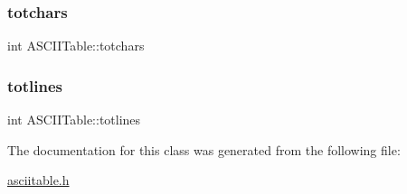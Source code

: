 \subsubsection{\texorpdfstring{totchars}{totchars}}
{\footnotesize\ttfamily int A\+S\+C\+I\+I\+Table\+::totchars}

\mbox{\label{classASCIITable_a130cbac5edad2ce441d7532c0d8b7ba9}} 
\subsubsection{\texorpdfstring{totlines}{totlines}}
{\footnotesize\ttfamily int A\+S\+C\+I\+I\+Table\+::totlines}



The documentation for this class was generated from the following file\+:\begin{DoxyCompactItemize}
\item 
\hyperlink{asciitable_8h}{asciitable.\+h}\end{DoxyCompactItemize}
